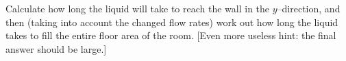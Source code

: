 \begin{enumerate}
\begin{enumerate}
            Calculate how long the liquid will take to reach the wall in the $ y$--direction, and then (taking into account
            the changed flow rates) work out how long the liquid takes to fill the entire floor area of the room. [Even more
            useless hint: the final answer should be large.]
    \end{enumerate}
\end{enumerate}
